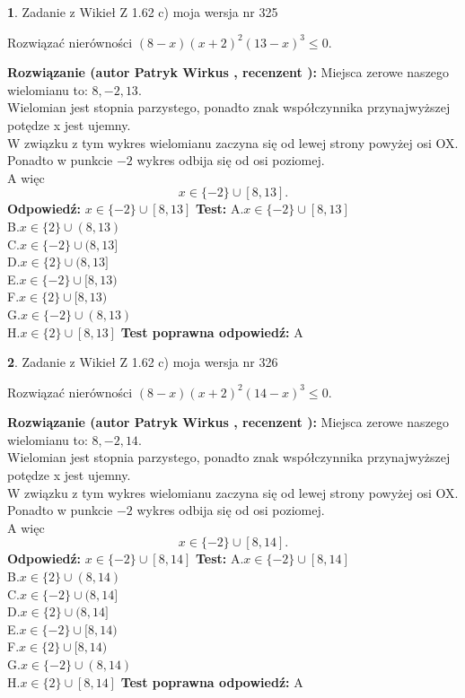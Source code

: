 \documentclass[12pt, a4paper]{article}
\theoremstyle{definition} %
\newtheorem{zad}{}
\newcommand{\zadStart}[1]{\begin{zad}#1\newline}
\newcommand{\zadStop}{\end{zad}}
\newcommand{\rozwStart}[2]{\noindent \textbf{Rozwiązanie (autor #1 , recenzent #2): }\newline}
\newcommand{\rozwStop}{\newline}
\newcommand{\odpStart}{\noindent \textbf{Odpowiedź:}\newline}
\newcommand{\odpStop}{\newline}
\newcommand{\testStart}{\noindent \textbf{Test:}\newline}
\newcommand{\testStop}{\newline}
\newcommand{\kluczStart}{\noindent \textbf{Test poprawna odpowiedź:}\newline}
\newcommand{\kluczStop}{\newline}
\begin{document}
\zadStart{Zadanie z Wikieł Z 1.62 c) moja wersja nr 325}

Rozwiązać nierówności $(8-x)(x+2)^{2}(13-x)^{3}\le0$.
\zadStop
\rozwStart{Patryk Wirkus}{}
Miejsca zerowe naszego wielomianu to: $8, -2, 13$.\\
Wielomian jest stopnia parzystego, ponadto znak współczynnika przy\linebreak najwyższej potędze x jest ujemny.\\ W związku z tym wykres wielomianu zaczyna się od lewej strony powyżej osi OX.\\
Ponadto w punkcie $-2$ wykres odbija się od osi poziomej.\\
A więc $$x \in \{-2\} \cup [8,13].$$
\rozwStop
\odpStart
$x \in \{-2\} \cup [8,13]$
\odpStop
\testStart
A.$x \in \{-2\} \cup [8,13]$\\
B.$x \in \{2\} \cup (8,13)$\\
C.$x \in \{-2\} \cup (8,13]$\\
D.$x \in \{2\} \cup (8,13]$\\
E.$x \in \{-2\} \cup [8,13)$\\
F.$x \in \{2\} \cup [8,13)$\\
G.$x \in \{-2\} \cup (8,13)$\\
H.$x \in \{2\} \cup [8,13]$
\testStop
\kluczStart
A
\kluczStop



\zadStart{Zadanie z Wikieł Z 1.62 c) moja wersja nr 326}

Rozwiązać nierówności $(8-x)(x+2)^{2}(14-x)^{3}\le0$.
\zadStop
\rozwStart{Patryk Wirkus}{}
Miejsca zerowe naszego wielomianu to: $8, -2, 14$.\\
Wielomian jest stopnia parzystego, ponadto znak współczynnika przy\linebreak najwyższej potędze x jest ujemny.\\ W związku z tym wykres wielomianu zaczyna się od lewej strony powyżej osi OX.\\
Ponadto w punkcie $-2$ wykres odbija się od osi poziomej.\\
A więc $$x \in \{-2\} \cup [8,14].$$
\rozwStop
\odpStart
$x \in \{-2\} \cup [8,14]$
\odpStop
\testStart
A.$x \in \{-2\} \cup [8,14]$\\
B.$x \in \{2\} \cup (8,14)$\\
C.$x \in \{-2\} \cup (8,14]$\\
D.$x \in \{2\} \cup (8,14]$\\
E.$x \in \{-2\} \cup [8,14)$\\
F.$x \in \{2\} \cup [8,14)$\\
G.$x \in \{-2\} \cup (8,14)$\\
H.$x \in \{2\} \cup [8,14]$
\testStop
\kluczStart
A
\kluczStop
\end{document}
